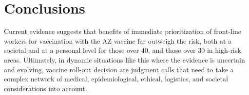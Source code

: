 \documentclass[]{interact}
\theoremstyle{plain}%
\theoremstyle{definition}
\theoremstyle{remark}
\begin{document}
\hypertarget{conclusions}{%
\section{Conclusions}\label{conclusions}}

Current evidence suggests that benefits of immediate prioritization of
front-line workers for vaccination with the AZ vaccine far outweigh the
risk, both at a societal and at a personal level for those over 40, and
those over 30 in high-risk areas. Ultimately, in dynamic situations like
this where the evidence is uncertain and evolving, vaccine roll-out
decision are judgment calls that need to take a complex network of
medical, epidemiological, ethical, logistics, and societal
considerations into account.



\end{document}
